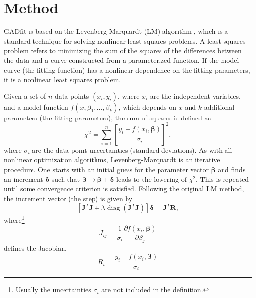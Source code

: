 \documentclass{article}
\DeclareMathOperator{\diag}{diag}
\begin{document}
\section{Method}

GADfit is based on the Levenberg-Marquardt (LM) algorithm \cite{marquardt63}, which is a standard technique for solving nonlinear least squares problems. A least squares problem refers to minimizing the sum of the squares of the differences between the data and a curve constructed from a parameterized function. If the model curve (the fitting function) has a nonlinear dependence on the fitting parameters, it is a nonlinear least squares problem.

Given a set of $n$ data points $(x_i,y_i)$, where $x_i$ are the independent variables, and a model function $f(x, \beta_1, \ldots, \beta_k)$, which depends on $x$ and $k$ additional parameters (the fitting parameters), the sum of squares is defined as
\begin{equation}
  \label{eq:chi2}
  \chi^2 = \sum_{i=1}^n \left[ \frac{y_i - f(x_i, \bm\beta)}{\sigma_i}
  \right]^2,
\end{equation}
where $\sigma_i$ are the data point uncertainties (standard deviations). As with all nonlinear optimization algorithms, Levenberg-Marquardt is an iterative procedure. One starts with an initial guess for the parameter vector $\bm\beta$ and finds an increment $\bm\delta$ such that $\bm\beta \rightarrow \bm\beta + \bm\delta$ leads to the lowering of $\chi^2$. This is repeated until some convergence criterion is satisfied. Following the original LM method, the increment vector (the step) is given by
\begin{equation}
  \label{eq:LM}
  \left[\bm J^T \bm J + \lambda\diag \left(\bm J^T \bm J\right)
  \right] \bm\delta = \bm J^T \bm R,
\end{equation}
where\footnote{Usually the uncertainties $\sigma_i$ are not included in the
  definition.}
\begin{equation}
  \label{eq:Jacobian}
  J_{ij} = \frac{1}{\sigma_i} \frac{\partial f(x_i, \bm \beta)}
  {\partial \beta_j}
\end{equation}
defines the Jacobian,
\begin{equation}
  R_i = \frac{y_i - f(x_i,\bm \beta)}{\sigma_i}
\end{equation}
\end{document}
